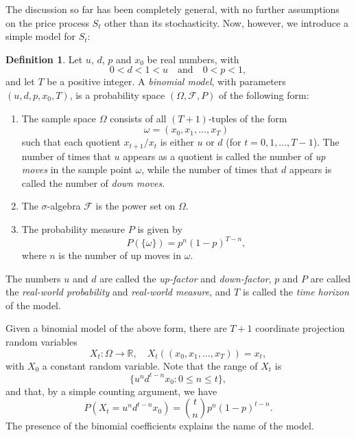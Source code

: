 \documentclass[reqno]{amsart}
\theoremstyle{definition}
\newtheorem{defn}[thm]{Definition}
\numberwithin{equation}{section}
\begin{document}
The discussion so far has been completely general, with no further assumptions on the price process $S_t$ other than its stochasticity. Now, however, we introduce a simple model for $S_t$:

\begin{defn}\label{defn:binomial}
Let $u$, $d$, $p$ and $x_0$ be real numbers, with
	\[
	0 < d < 1 < u \quad \text{and} \quad 0 < p < 1,
	\]
and let $T$ be a positive integer. A \textit{binomial model}, with parameters $(u,d,p,x_0,T)$, is a probability space $(\Omega, \mathcal{F},P)$ of the following form:
\begin{enumerate}
\item The sample space $\Omega$ consists of all $(T+1)$-tuples of the form
	\[
	\omega = (x_0, x_1,\ldots,x_T)
	\]
such that each quotient $x_{t+1} / x_t$ is either $u$ or $d$ (for $t=0,1,\ldots, T-1$). The number of times that $u$ appears as a quotient is called the number of \textit{up moves} in the sample point $\omega$, while the number of times that $d$ appears is called the number of \textit{down moves}.
\item The $\sigma$-algebra $\mathcal{F}$ is the power set on $\Omega$.
\item The probability measure $P$ is given by
	\begin{equation}\label{eq:real-world-measure}
	P \left( \{\omega\} \right) = p^n (1-p)^{T-n},
	\end{equation}
	where $n$ is the number of up moves in $\omega$.
\end{enumerate}
The numbers $u$ and $d$ are called the \textit{up-factor} and \textit{down-factor}, $p$ and $P$ are called the \textit{real-world probability} and \textit{real-world measure}, and $T$ is called the \textit{time horizon} of the model.
\end{defn}

Given a binomial model of the above form, there are $T+1$ coordinate projection random variables
	\begin{equation}\label{eq:binomial-proj}
	X_t: \Omega \to \mathbb{R}, \quad X_t\left( (x_0, x_1,\ldots,x_T)\right) = x_t,
	\end{equation}
with $X_0$ a constant random variable. Note that the range of $X_t$ is
	\[
	\{ u^n d^{t-n} x_0 : 0 \leq n \leq t\},
	\]
and that, by a simple counting argument, we have
	\begin{equation}\label{eq:binom-prob}
	P\left(X_t = u^nd^{t-n} x_0 \right) = \binom{t}{n} p^n (1-p)^{t-n}.
	\end{equation}
The presence of the binomial coefficients explains the name of the model.
\end{document}
